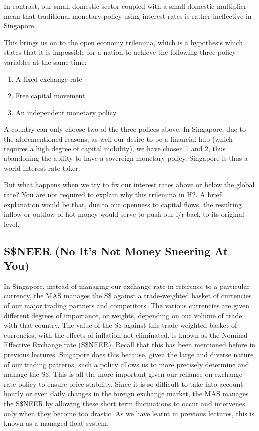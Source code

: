 \documentclass[DIV=classic,11pt,numbers=noenddot,parskip]{scrartcl}
\begin{document}
In contrast, our small domestic sector coupled with a small domestic multiplier mean that traditional monetary policy using interest rates is rather ineffective in Singapore.

This brings us on to the open economy trilemma, which is a hypothesis which states that it is impossible for a nation to achieve the following three policy variables at the same time:
\begin{enumerate}
\item A fixed exchange rate
\item Free capital movement
\item An independent monetary policy
\end{enumerate}
A country can only choose two of the three polices above. In Singapore, due to the aforementioned reasons, as well our desire to be a financial hub (which requires a high degree of capital mobility), we have chosen 1 and 2, thus abandoning the ability to have a sovereign monetary policy. Singapore is thus a world interest rate taker.

But what happens when we try to fix our interest rates above or below the global rate?  You are not required to explain why this trilemma in H2. A brief explanation would be that, due to our openness to capital flows, the resulting inflow or outflow of hot money would serve to push our i/r back to its original level.
\subsection{S\$NEER (No It's Not Money Sneering At You)}
In Singapore, instead of managing our exchange rate in reference to a particular currency, the MAS manages the S\$ against a trade-weighted basket of currencies of our major trading partners and competitors. The various currencies are given different degrees of importance, or weights, depending on our volume of trade with that country.
The value of the S\$ against this trade-weighted basket of currencies, with the effects of inflation not eliminated, is known as the Nominal Effective Exchange rate (S\$NEER). Recall that this has been mentioned before in previous lectures. Singapore does this because, given the large and diverse nature of our trading patterns, such a policy allows us to more precisely determine and manage the S\$. This is all the more important given our reliance on exchange rate policy to ensure price stability.
Since it is so difficult to take into account hourly or even daily changes in the foreign exchange market, the MAS manages the S\$NEER by allowing these short term fluctuations to occur and intervenes only when they become too drastic. As we have learnt in previous lectures, this is known as a managed float system.  
\end{document}
